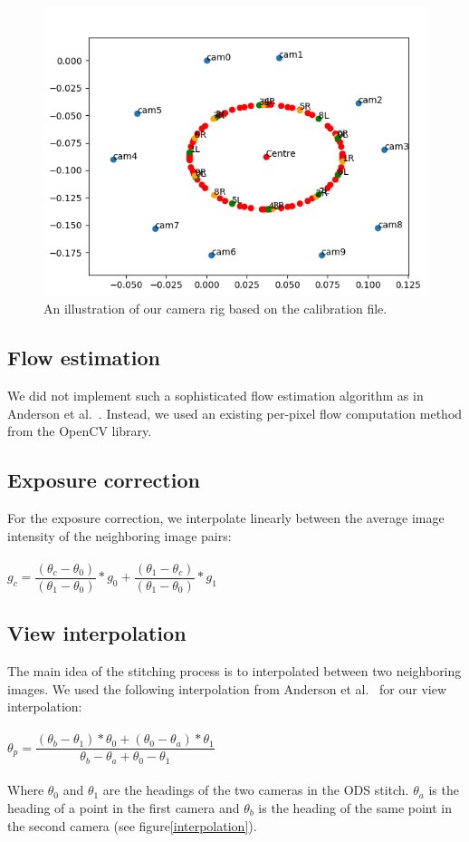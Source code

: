 \documentclass[10pt,twocolumn,letterpaper]{article}
\begin{document}
\begin{figure}[t]
\begin{center}
   \includegraphics[width=0.8\linewidth]{pictures/our_camera_rig.png}
\end{center}
   \caption{An illustration of our camera rig based on the calibration file.}
\label{rig}
\end{figure}

\subsection{Flow estimation}
We did not implement such a sophisticated flow estimation algorithm as in Anderson et al.~\cite{jump16}. Instead, we used an existing per-pixel flow computation method from the OpenCV library.

\subsection{Exposure correction}
For the exposure correction, we interpolate linearly between the average image intensity of the neighboring image pairs:\\
\\
$g_{c}=\dfrac{(\theta_{c}-\theta_{0})}{(\theta_1-\theta_{0})}*g_{0} + \dfrac{(\theta_{1}-\theta_{c})}{(\theta_1-\theta_{0})}*g_{1}$
\\
\subsection{View interpolation}
The main idea of the stitching process is to interpolated between two neighboring images.
We used the following interpolation from Anderson et al.~\cite{jump16} for our view interpolation:\\
\\
$\theta_p=\dfrac{(\theta_{b}-\theta_{1})*\theta_{0}+(\theta_{0}-\theta_{a})*\theta_{1}}{\theta_{b}-\theta_{a}+\theta_{0}-\theta_{1}}$
\\
\\
Where $\theta_ {0}$ and $\theta_ {1}$ are the headings of the two cameras in the ODS stitch. $\theta_ {a}$ is the heading of a point in the first camera and $\theta_ {b}$ is the heading of the same point in the second camera (see figure\ref{interpolation}).
\end{document}
